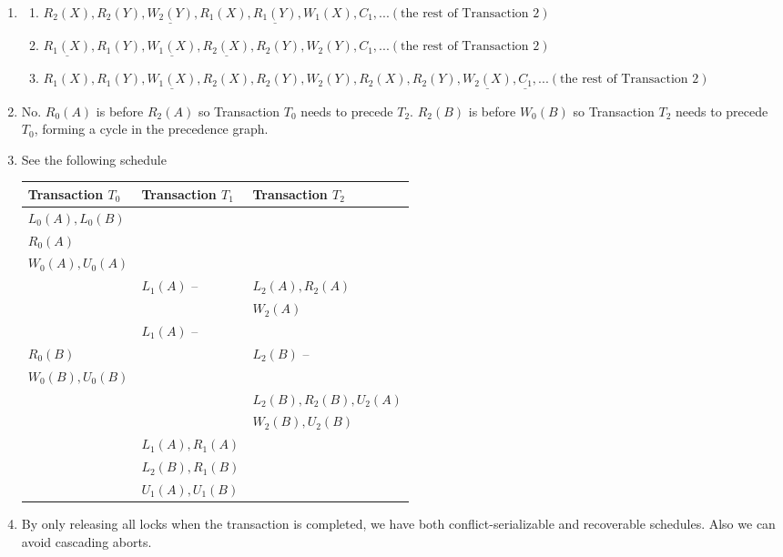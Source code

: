 \documentclass[10pt]{myland}
\begin{document}
	\begin{enumerate}
		\item
		\begin{enumerate}[label=(\alph*)]
			\item $R_2(X), R_2(Y), \underline{W_2(Y)}, R_1(X), \underline{R_1(Y)}, W_1(X), C_1, ... (\text{the rest of
				Transaction 2})$
			\item $\underline{R_1(X)}, R_1(Y), \underline{W_1(X)}, \underline{R_2(X)}, R_2(Y), W_2(Y), C_1, ...
				(\text{the rest of Transaction 2})$
            \item $R_1(X), R_1(Y), \underline{W_1(X)}, R_2(X), R_2(Y), W_2(Y), R_2(X), R_2(Y), \underline{W_2(X)},
				\underline{C_1}, ... (\text{the rest of Transaction 2})$
		\end{enumerate}

		\item No. $R_0(A)$ is before $R_2(A)$ so Transaction $T_0$ needs to precede $T_2$. $R_2(B)$ is before $W_0(B)$
			so Transaction $T_2$ needs to precede $T_0$, forming a cycle in the precedence graph.

		\item See the following schedule
            \begin{center}
                \begin{tabularx}{\linewidth}{Y|Y|Y}
					Transaction $T_0$ & Transaction $T_1$ & Transaction $T_2$ \\ \hline
					$L_0(A), L_0(B)$ & & \\
					$R_0(A)$ & & \\
					$W_0(A), U_0(A)$ & & \\
					& $L_1(A)$ -- \color{red}{DENIED}& $L_2(A), R_2(A)$\\
					& & $W_2(A)$\\
					& $L_1(A)$ -- \color{red}{DENIED}& \\
					$R_0(B)$ &  & $L_2(B)$ -- \color{red}{DENIED}\\
					$W_0(B), U_0(B)$ &  & \\
					&  & $L_2(B), R_2(B), U_2(A)$\\
					&  & $W_2(B), U_2(B)$\\
					& $L_1(A), R_1(A)$ & \\
					& $L_2(B), R_1(B)$ & \\
					& $U_1(A), U_1(B)$ & \\
                \end{tabularx}
            \end{center}

		\item By only releasing all locks when the transaction is completed, we have both conflict-serializable and
			recoverable schedules. Also we can avoid cascading aborts.
	\end{enumerate}
\end{document}
